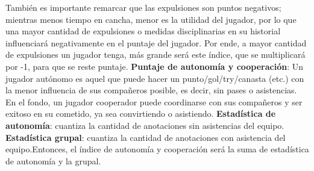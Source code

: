 \documentclass[a4paper]{article}
\begin{document}
También es importante remarcar que las expulsiones son puntos negativos; mientras menos tiempo en cancha, menor es la utilidad del jugador, por lo que una mayor cantidad de expulsiones o medidas disciplinarias en su historial influenciará negativamente en el puntaje del jugador. Por ende, a mayor cantidad de expulsiones un jugador tenga, más grande será este índice, que se multiplicará por -1, para que se reste puntaje. \newline\newline \textbf{Puntaje de autonomía y cooperación}: Un jugador autónomo es aquel que puede hacer un punto/gol/try/canasta (etc.) con la menor influencia de sus compañeros posible, es decir, sin pases o asistencias. En el fondo, un jugador cooperador puede coordinarse con sus compañeros y ser exitoso en su cometido, ya sea convirtiendo o asistiendo. \newline\newline \textbf{Estadística de autonomía}: cuantiza la cantidad de anotaciones sin asistencias del equipo. \newline\newline \textbf{
Estadística grupal}: cuantiza la cantidad de anotaciones con asistencia del equipo.\newline\newline Entonces, el índice de autonomía y cooperación será la suma de estadística de autonomía y la grupal. 
\end{document}
